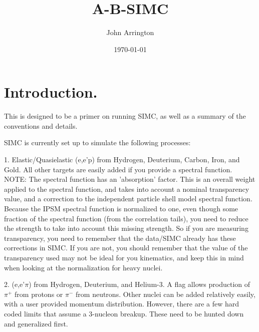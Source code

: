 

\def    \la     {\lambda}
\def    \eps    {\epsilon}
\def    \deg    {^\circ}
\def    \be     {\begin{equation}}
\def    \ee     {\end{equation}}
\def    \beqa   {\begin{eqnarray}}
\def    \eeqa   {\end{eqnarray}}
\def    \gtpr   {\Gamma_T^\prime}


\title{A-B-SIMC}
\author{John Arrington}
\date{\today}
\maketitle



\section{Introduction.}

This is designed to be a primer on running SIMC, as well as a summary of the
conventions and details.

SIMC is currently set up to simulate the following processes:

\smallskip

1. Elastic/Quasielastic (e,e'p) from Hydrogen, Deuterium, Carbon, Iron, and
Gold. All other targets are easily added if you provide a spectral function.
NOTE: The spectral function has an 'absorption' factor.  This is an overall
weight applied to the spectral function, and takes into account a nominal
transparency value, and a correction to the independent particle shell model
spectral function.  Because the IPSM spectral function is normalized to one,
even though some fraction of the spectral function (from the correlation tails),
you need to reduce the strength to take into account this missing strength.
So if you are measuring transparency, you need to remember that the data/SIMC
already has these corrections in SIMC.  If you are not, you should remember
that the value of the transparency used may not be ideal for you kinematics,
and keep this in mind when looking at the normalization for heavy nuclei.

\smallskip

2. (e,e'$\pi$) from Hydrogen, Deuterium, and Helium-3.   A flag allows
production of $\pi^+$ from protons or $\pi^-$ from neutrons.  Other nuclei can
be added relatively easily, with a user provided momentum distribution. 
However, there are a few hard coded limits that assume a 3-nucleon breakup. 
These need to be hunted down and generalized first.

